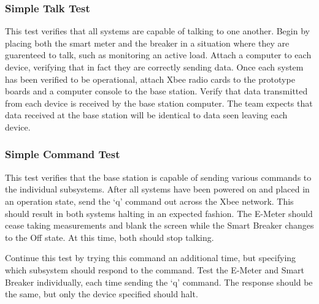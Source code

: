 \subsubsection{Simple Talk Test}
This test verifies that all systems are capable of talking to one another. Begin by placing both the smart meter and the breaker in a situation where they are guarenteed to talk, such as monitoring an active load. Attach a computer to each device, verifying that in fact they are correctly sending data. Once each system has been verified to be operational, attach Xbee radio cards to the prototype boards and a computer console to the base station. Verify that data transmitted from each device is received by the base station computer. The team expects that data received at the base station will be identical to data seen leaving each device.

\subsubsection{Simple Command Test}
This test verifies that the base station is capable of sending various commands to the individual subsystems. After all systems have been powered on and placed in an operation state, send the `q' command out across the Xbee network. This should result in both systems halting in an expected fashion. The E-Meter should cease taking measurements and blank the screen while the Smart Breaker changes to the Off state. At this time, both should stop talking.

Continue this test by trying this command an additional time, but specifying which subsystem should respond to the command. Test the E-Meter and Smart Breaker individually, each time sending the `q' command. The response should be the same, but only the device specified should halt.

